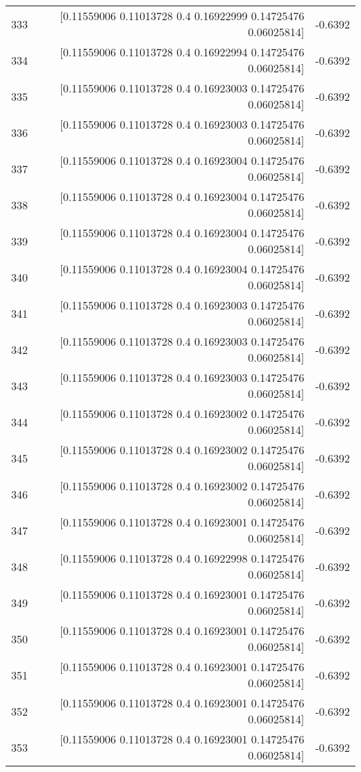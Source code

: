 \begin{longtable}{lrr}
333 & [0.11559006 0.11013728 0.4        0.16922999 0.14725476 0.06025814] & -0.6392 \\
334 & [0.11559006 0.11013728 0.4        0.16922994 0.14725476 0.06025814] & -0.6392 \\
335 & [0.11559006 0.11013728 0.4        0.16923003 0.14725476 0.06025814] & -0.6392 \\
336 & [0.11559006 0.11013728 0.4        0.16923003 0.14725476 0.06025814] & -0.6392 \\
337 & [0.11559006 0.11013728 0.4        0.16923004 0.14725476 0.06025814] & -0.6392 \\
338 & [0.11559006 0.11013728 0.4        0.16923004 0.14725476 0.06025814] & -0.6392 \\
339 & [0.11559006 0.11013728 0.4        0.16923004 0.14725476 0.06025814] & -0.6392 \\
340 & [0.11559006 0.11013728 0.4        0.16923004 0.14725476 0.06025814] & -0.6392 \\
341 & [0.11559006 0.11013728 0.4        0.16923003 0.14725476 0.06025814] & -0.6392 \\
342 & [0.11559006 0.11013728 0.4        0.16923003 0.14725476 0.06025814] & -0.6392 \\
343 & [0.11559006 0.11013728 0.4        0.16923003 0.14725476 0.06025814] & -0.6392 \\
344 & [0.11559006 0.11013728 0.4        0.16923002 0.14725476 0.06025814] & -0.6392 \\
345 & [0.11559006 0.11013728 0.4        0.16923002 0.14725476 0.06025814] & -0.6392 \\
346 & [0.11559006 0.11013728 0.4        0.16923002 0.14725476 0.06025814] & -0.6392 \\
347 & [0.11559006 0.11013728 0.4        0.16923001 0.14725476 0.06025814] & -0.6392 \\
348 & [0.11559006 0.11013728 0.4        0.16922998 0.14725476 0.06025814] & -0.6392 \\
349 & [0.11559006 0.11013728 0.4        0.16923001 0.14725476 0.06025814] & -0.6392 \\
350 & [0.11559006 0.11013728 0.4        0.16923001 0.14725476 0.06025814] & -0.6392 \\
351 & [0.11559006 0.11013728 0.4        0.16923001 0.14725476 0.06025814] & -0.6392 \\
352 & [0.11559006 0.11013728 0.4        0.16923001 0.14725476 0.06025814] & -0.6392 \\
353 & [0.11559006 0.11013728 0.4        0.16923001 0.14725476 0.06025814] & -0.6392 \\

\end{longtable}
